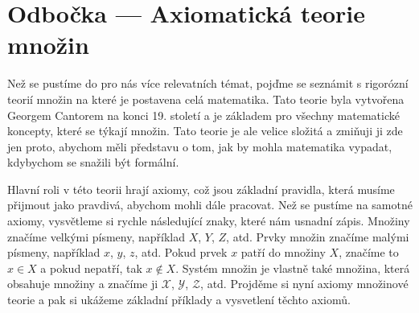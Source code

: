 
\section{Odbočka --- Axiomatická teorie množin}
Než se pustíme do pro nás více relevatních témat, pojďme se seznámit s rigorózní teorií množin na které je postavena celá matematika. Tato teorie byla vytvořena Georgem Cantorem na konci 19. století a je základem pro všechny matematické koncepty, které se týkají množin. Tato teorie je ale velice složitá a zmiňuji ji zde jen proto, abychom měli představu o tom, jak by mohla matematika vypadat, kdybychom se snažili být formální.

Hlavní roli v této teorii hrají axiomy, což jsou základní pravidla, která musíme přijmout jako pravdivá, abychom mohli dále pracovat. Než se pustíme na samotné axiomy, vysvětleme si rychle následující znaky, které nám usnadní zápis. Množiny značíme velkými písmeny, například $X$, $Y$, $Z$, atd. Prvky množin značíme malými písmeny, například $x$, $y$, $z$, atd. Pokud prvek $x$ patří do množiny $X$, značíme to $x\in X$ a pokud nepatří, tak $x\notin X$. Systém množin je vlastně také množina, která obsahuje množiny a značíme ji $\mathcal{X}$, $\mathcal{Y}$, $\mathcal{Z}$, atd. Projděme si nyní axiomy množinové teorie a pak si ukážeme základní příklady a vysvetlení těchto axiomů. 

